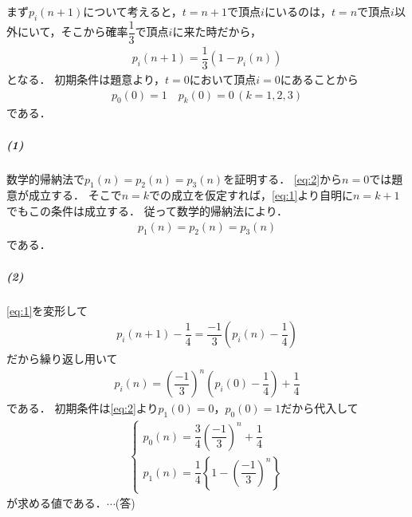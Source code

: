 \documentclass[../../main.tex]{subfiles}
\begin{document}
まず$p_i(n+1)$について考えると，$t=n+1$で頂点$i$にいるのは，$t=n$で頂点$i$以外にいて，そこから確率$\dfrac{1}{3}$で頂点$i$に来た時だから，
\begin{align}
  p_i(n+1)=\dfrac{1}{3}(1-p_i(n)) \label{eq:1}
\end{align}
となる．
初期条件は題意より，$t=0$において頂点$i=0$にあることから
\begin{align}
  p_0(0) = 1 \quad p_{k}(0)=0\, (k=1,2,3) \label{eq:2}
\end{align}
である．

\subparagraph{(1)}

数学的帰納法で$p_1(n)=p_2(n)=p_3(n)$を証明する．
\cref{eq:2}から$n=0$では題意が成立する．
そこで$n=k$での成立を仮定すれば，\cref{eq:1}より自明に$n=k+1$でもこの条件は成立する．
従って数学的帰納法により．
\begin{align}
  p_1(n)=p_2(n)=p_3(n)
\end{align}
である．

\subparagraph{(2)}

\cref{eq:1}を変形して
\begin{align}
  p_i(n+1)-\dfrac{1}{4}=\dfrac{-1}{3}\left(p_i(n)-\dfrac{1}{4}\right) \label{eq:3}
\end{align}
だから繰り返し用いて
\begin{align}
  p_i(n)=\left(\dfrac{-1}{3}\right)^n\left(p_i(0)-\dfrac{1}{4}\right)+\dfrac{1}{4}
\end{align}
である．
初期条件は\cref{eq:2}より$p_1(0)=0$，$p_0(0)=1$だから代入して
\begin{align}
  \begin{cases}
    p_0(n)=\dfrac{3}{4}\left(\dfrac{-1}{3}\right)^n+\dfrac{1}{4} \\
    p_1(n)=\dfrac{1}{4}\left\{1-\left(\dfrac{-1}{3}\right)^n\right\}
  \end{cases}
\end{align}
が求める値である．$\cdots$(答)
\newpage
\end{document}
